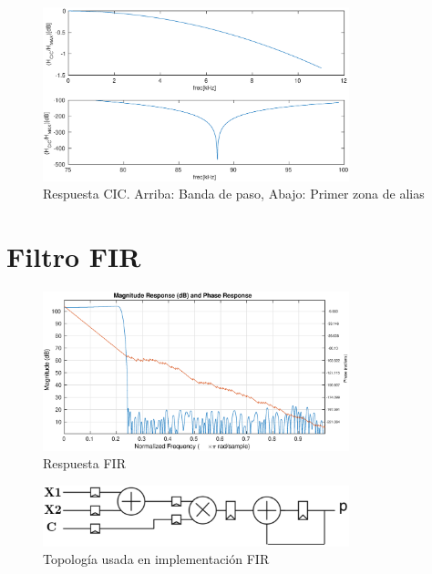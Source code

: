 \documentclass[a4paper,conference]{IEEEtran}
\begin{document}
\begin{figure}[!t]
\centering
\includegraphics[width=3.5in]{Respuesta_CIC}
\caption{Respuesta CIC. Arriba: Banda de paso, Abajo: Primer zona de alias}
\label{fig:CIC_resp}
\end{figure}

\section{Filtro FIR}

\begin{figure}[!t]
	\centering
	\includegraphics[width=3.5in]{Respuesta_FIR}
	\caption{Respuesta FIR}
	\label{fig:FIR_res}
\end{figure}


\begin{figure}[!t]
\centering
\includegraphics[width=3.5in]{FIR_Topologia}
\caption{Topolog\'ia usada en implementaci\'on FIR}
\label{fig:FIR_top}
\end{figure}
\end{document}
